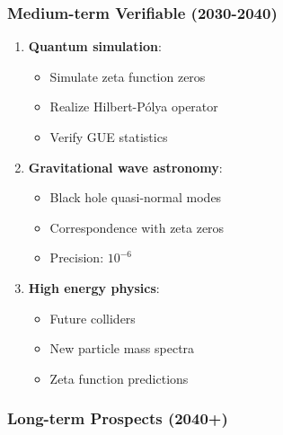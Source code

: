 \documentclass[11pt]{article}
\theoremstyle{plain}
\theoremstyle{definition}
\theoremstyle{remark}
\begin{document}
\subsubsection{Medium-term Verifiable (2030-2040)}

\begin{enumerate}
\item \textbf{Quantum simulation}:
   \begin{itemize}
   \item Simulate zeta function zeros
   \item Realize Hilbert-Pólya operator
   \item Verify GUE statistics
   \end{itemize}

\item \textbf{Gravitational wave astronomy}:
   \begin{itemize}
   \item Black hole quasi-normal modes
   \item Correspondence with zeta zeros
   \item Precision: $10^{-6}$
   \end{itemize}

\item \textbf{High energy physics}:
   \begin{itemize}
   \item Future colliders
   \item New particle mass spectra
   \item Zeta function predictions
   \end{itemize}
\end{enumerate}

\subsubsection{Long-term Prospects (2040+)}
\end{document}
